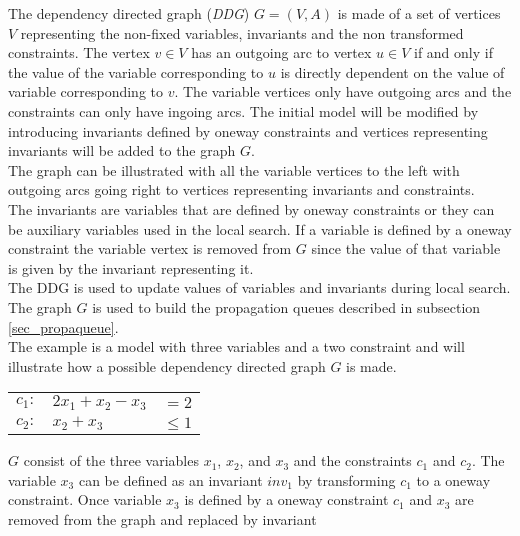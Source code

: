 The dependency directed graph (\emph{DDG}) $G=(V,A)$ is made of a set of vertices $V$ representing the non-fixed 
variables, invariants and the non transformed constraints. The vertex $v \in V$ has an outgoing arc to vertex $u \in V$ 
if and only if the value of the variable corresponding to $u$ is directly dependent on the value of variable 
corresponding to $v$. The variable vertices only have outgoing arcs and the constraints can only have ingoing arcs. 
 The initial model will be modified by introducing invariants defined by 
oneway constraints and vertices representing invariants will be added to the graph $G$. \\
The graph can be illustrated with all the variable vertices to the left with outgoing arcs going right to vertices 
representing invariants and constraints.  \\  
The invariants are variables that are defined by oneway constraints or they can be auxiliary variables used in the local 
search. If a variable is defined by a oneway constraint the variable vertex is removed from $G$ since the value of that 
variable is given by the invariant representing it. \\  
The DDG is used to update values of variables and invariants during local search. The graph $G$ is used to build the 
propagation queues described in subsection \ref{sec_propaqueue}. \\
The example is a model with three variables and a two constraint and will illustrate how a possible dependency directed 
graph $G$ is made. 
\begin{center}
\begin{tabular}{rlr}
$ c_1: $&$2x_1 + x_2 - x_3 $&$= 2$ \\
$ c_2: $&$x_2 + x_3 $&$\leq 1$ \\
\end{tabular} 
\end{center}
$G$ consist of the three variables $x_1$, $x_2$, and $x_3$ and the constraints $c_1$ and $c_2$. The 
variable $x_3$ can be defined as an invariant $inv_1$ by transforming $c_1$ to a oneway constraint. Once 
variable $x_3$ is defined by a oneway constraint $c_1$ and $x_3$ are removed from the graph and replaced by invariant 
